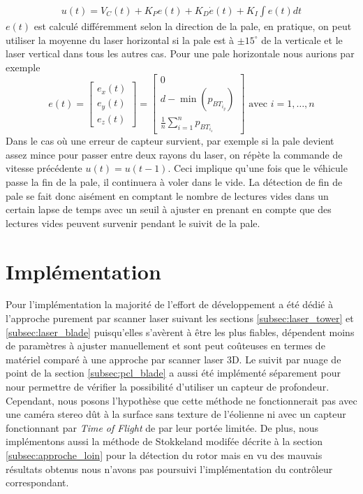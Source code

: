 \begin{align}
  u(t) = V_C(t) + K_P e(t) + K_D\dot{e}(t) + K_I\int{e(t)dt}
  \label{eq:pid_laser_blade}
\end{align}
$e(t)$ est calculé différemment selon la direction de la pale, en pratique, on peut utiliser la moyenne du laser horizontal si la pale est à $\pm15^{\circ}$ de la verticale et le laser vertical dans tous les autres cas. Pour une pale horizontale nous aurions par exemple
\[
e(t) = \begin{bmatrix}e_x(t) \\ e_y(t) \\ e_z(t)\end{bmatrix} =
\begin{bmatrix}
0 \\ d - \min(p_{{BT}_{i_y}}) \\ \frac{1}{n}\sum_{i=1}^{n}p_{{BT}_{i_z}}
\end{bmatrix} \text{ avec } i=1,\ldots,n
\]
Dans le cas où une erreur de capteur survient, par exemple si la pale devient assez mince pour passer entre deux rayons du laser, on répète la commande de vitesse précédente $u(t) = u(t-1)$. Ceci implique qu'une fois que le véhicule passe la fin de la pale, il continuera à voler dans le vide. La détection de fin de pale se fait donc aisément en comptant le nombre de lectures vides dans un certain lapse de temps avec un seuil à ajuster en prenant en compte que des lectures vides peuvent survenir pendant le suivit de la pale.

%

\clearpage
\section{Implémentation}

Pour l'implémentation la majorité de l'effort de développement a été dédié à l'approche purement par scanner laser suivant les sections \ref{subsec:laser_tower} et \ref{subsec:laser_blade} puisqu'elles s'avèrent à être les plus fiables, dépendent moins de paramètres à ajuster manuellement et sont peut coûteuses en termes de matériel comparé à une approche par scanner laser 3D. Le suivit par nuage de point de la section \ref{subsec:pcl_blade} a aussi été implémenté séparement pour nour permettre de vérifier la possibilité d'utiliser un capteur de profondeur. Cependant, nous posons l'hypothèse que cette méthode ne fonctionnerait pas avec une caméra stereo dût à la surface sans texture de l'éolienne ni avec un capteur fonctionnant par \textit{Time of Flight} de par leur portée limitée.
De plus, nous implémentons aussi la méthode de Stokkeland modifée décrite à la section \ref{subsec:approche_loin} pour la détection du rotor mais en vu des mauvais résultats obtenus nous n'avons pas poursuivi l'implémentation du contrôleur correspondant.

